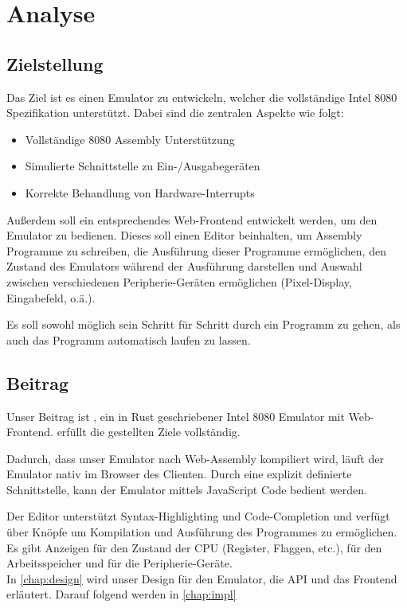 \chapter{Analyse}

\section{Zielstellung}\label{goals}

Das Ziel ist es einen Emulator zu entwickeln, welcher die vollständige Intel 8080 Spezifikation\cite{datasheet} unterstützt. Dabei sind die zentralen Aspekte wie folgt:

\begin{itemize}
    \item Vollständige 8080 Assembly Unterstützung
    \item Simulierte Schnittstelle zu Ein-/Ausgabegeräten
    \item Korrekte Behandlung von Hardware-Interrupts
\end{itemize}

Außerdem soll ein entsprechendes Web-Frontend entwickelt werden, um den Emulator zu bedienen.
Dieses soll einen Editor beinhalten, um Assembly Programme zu schreiben, die Ausführung dieser Programme ermöglichen, den Zustand des Emulators während der Ausführung darstellen und Auswahl zwischen verschiedenen Peripherie-Geräten ermöglichen (Pixel-Display, Eingabefeld, o.ä.). 

Es soll sowohl möglich sein Schritt für Schritt durch ein Programm zu gehen, als auch das Programm automatisch laufen zu lassen.

\section{Beitrag}

Unser Beitrag ist \Emu, ein in Rust geschriebener Intel 8080 Emulator mit Web-Frontend. \Emu erfüllt die gestellten Ziele vollständig.

Dadurch, dass unser Emulator nach Web-Assembly kompiliert wird, läuft der Emulator nativ im Browser des Clienten. Durch eine explizit definierte Schnittstelle, kann der Emulator mittels JavaScript Code bedient werden.

Der Editor unterstützt Syntax-Highlighting und Code-Completion und verfügt über Knöpfe um Kompilation und Ausführung des Programmes zu ermöglichen.
Es gibt Anzeigen für den Zustand der CPU (Register, Flaggen, etc.), für den Arbeitsspeicher und für die Peripherie-Geräte.\\

In \cref{chap:design} wird unser Design für den Emulator, die API und das Frontend
erläutert. Darauf folgend werden in \cref{chap:impl}
